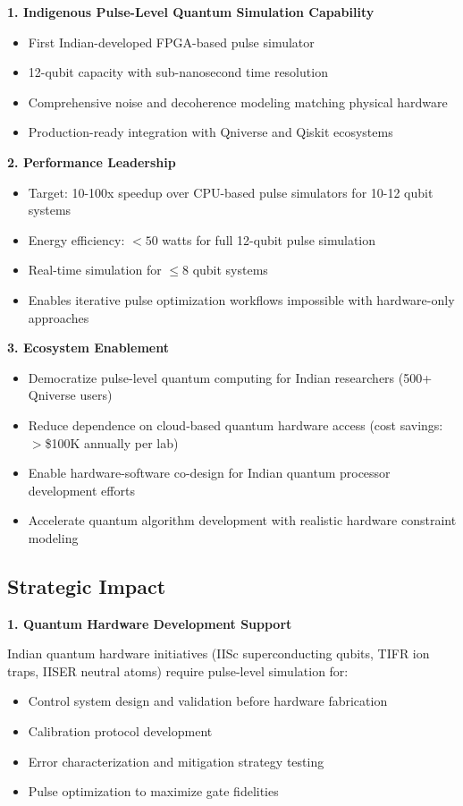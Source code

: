 \documentclass[12pt,a4paper]{article}
\begin{document}
\textbf{1. Indigenous Pulse-Level Quantum Simulation Capability}
\begin{itemize}[noitemsep]
\item First Indian-developed FPGA-based pulse simulator
\item 12-qubit capacity with sub-nanosecond time resolution
\item Comprehensive noise and decoherence modeling matching physical hardware
\item Production-ready integration with Qniverse and Qiskit ecosystems
\end{itemize}

\textbf{2. Performance Leadership}
\begin{itemize}[noitemsep]
\item Target: 10-100x speedup over CPU-based pulse simulators for 10-12 qubit systems
\item Energy efficiency: $<50$ watts for full 12-qubit pulse simulation
\item Real-time simulation for $\leq 8$ qubit systems
\item Enables iterative pulse optimization workflows impossible with hardware-only approaches
\end{itemize}

\textbf{3. Ecosystem Enablement}
\begin{itemize}[noitemsep]
\item Democratize pulse-level quantum computing for Indian researchers (500+ Qniverse users)
\item Reduce dependence on cloud-based quantum hardware access (cost savings: $>$\$100K annually per lab)
\item Enable hardware-software co-design for Indian quantum processor development efforts
\item Accelerate quantum algorithm development with realistic hardware constraint modeling
\end{itemize}

\subsection{Strategic Impact}

\textbf{1. Quantum Hardware Development Support}

Indian quantum hardware initiatives (IISc superconducting qubits, TIFR ion traps, IISER neutral atoms) require pulse-level simulation for:
\begin{itemize}[noitemsep]
\item Control system design and validation before hardware fabrication
\item Calibration protocol development
\item Error characterization and mitigation strategy testing
\item Pulse optimization to maximize gate fidelities
\end{itemize}
\end{document}
